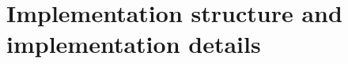 \chapter{Implementation structure and implementation details} %
\label{cha:implementation_structure_and_implementation_details}

